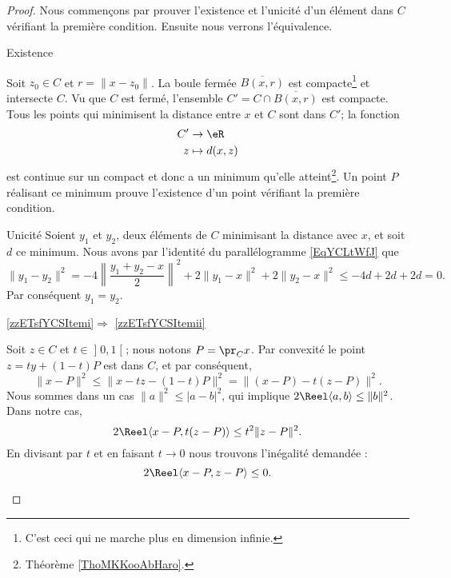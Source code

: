 \begin{proof}
    Nous commençons par prouver l'existence et l'unicité d'un élément dans \( C\) vérifiant la première condition. Ensuite nous verrons l'équivalence. 

    \begin{subproof}
        \item[Existence]
        
            Soit \( z_0\in C\) et \( r=\| x-z_0 \|\). La boule fermée \( \overline{ B(x,r) }\) est compacte\footnote{C'est ceci qui ne marche plus en dimension infinie.} et intersecte \( C\). Vu que \( C\) est fermé, l'ensemble \( C'=C\cap\overline{ B(x,r) }\) est compacte. Tous les points qui minimisent la distance entre \( x\) et \( C\) sont dans \( C'\); la fonction 
            \begin{equation}
                \begin{aligned}
                     C'&\to \eR \\
                    z&\mapsto d(x,z) 
                \end{aligned}
            \end{equation}
            est continue sur un compact et donc a un minimum qu'elle atteint\footnote{Théorème \ref{ThoMKKooAbHaro}.}. Un point \( P\) réalisant ce minimum prouve l'existence d'un point vérifiant la première condition.

        \item[Unicité]
            Soient \( y_1\) et \( y_2\), deux éléments de \( C\) minimisant la distance avec \( x\), et soit \( d\) ce minimum. Nous avons par l'identité du parallélogramme \eqref{EqYCLtWfJ} que
            \begin{equation}
                \| y_1-y_2 \|^2=-4\left\| \frac{ y_1+y_2-x }{2} \right\|^2+2\| y_1-x \|^2+2\| y_2-x \|^2\leq -4d+2d+2d=0.
            \end{equation}
            Par conséquent \( y_1=y_2\).

        \item[\ref{zzETsfYCSItemi}\( \Rightarrow\) \ref{zzETsfYCSItemii}]

            Soit \( z\in C\) et \( t\in \mathopen] 0 , 1 \mathclose[\); nous notons \( P=\pr_Cx\). Par convexité le point \( z=ty+(1-t)P\) est dans \( C\), et par conséquent,
                \begin{equation}
                    \| x-P \|^2\leq\| x-tz-(1-t)P \|^2=\| (x-P)-t(z-P) \|^2.
                \end{equation}
                Nous sommes dans un cas \( \| a \|^2\leq | a-b |^2\), qui implique \( 2\Reel\langle a, b\rangle \leq \| b \|^2\). Dans notre cas,
                \begin{equation}
                    2\Reel\langle x-P , t(z-P)\rangle \leq t^2\| z-P \|^2.
                \end{equation}
                En divisant par \( t\) et en faisant \( t\to 0\) nous trouvons l'inégalité demandée :
                \begin{equation}
                    2\Reel\langle x-P, z-P\rangle \leq 0.
                \end{equation}
                

\end{subproof}
\end{proof}

